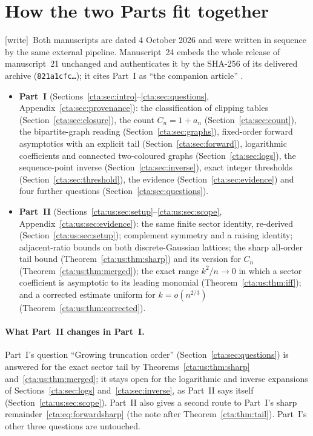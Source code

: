 \documentclass[11pt]{article}
\theoremstyle{definition}
\theoremstyle{remark}
\newcommand{\wtag}{\textup{[write]}}
\begin{document}
\setcounter{tocdepth}{1}
\tableofcontents
\newpage

\section{How the two Parts fit together}\label{cta:sec:guide}

\wtag\ Both manuscripts are dated 4 October 2026 and were written in
sequence by the same external pipeline. Manuscript~24 embeds the whole
release of manuscript~21 unchanged and authenticates it by the SHA-256 of
its delivered archive (\texttt{821a1cfc\ldots}); it cites Part~I as
``the companion article'' \cite{fixed}.

\begin{itemize}
\item \textbf{Part~I} (Sections~\ref{cta:sec:intro}--\ref{cta:sec:questions},
Appendix~\ref{cta:sec:provenance}): the classification of clipping tables
(Section~\ref{cta:sec:closure}), the count $C_n=1+a_n$
(Section~\ref{cta:sec:count}), the bipartite-graph reading
(Section~\ref{cta:sec:graphs}), fixed-order forward asymptotics with an
explicit tail (Section~\ref{cta:sec:forward}), logarithmic coefficients and
connected two-coloured graphs (Section~\ref{cta:sec:logs}), the
sequence-point inverse (Section~\ref{cta:sec:inverse}), exact integer
thresholds (Section~\ref{cta:sec:threshold}), the evidence
(Section~\ref{cta:sec:evidence}) and four further questions
(Section~\ref{cta:sec:questions}).
\item \textbf{Part~II} (Sections~\ref{cta:us:sec:setup}--\ref{cta:us:sec:scope},
Appendix~\ref{cta:us:sec:evidence}): the same finite sector identity,
re-derived (Section~\ref{cta:us:sec:setup}); complement symmetry and a
raising identity; adjacent-ratio bounds on both discrete-Gaussian lattices;
the sharp all-order tail bound (Theorem~\ref{cta:us:thm:sharp}) and its
version for $C_n$ (Theorem~\ref{cta:us:thm:merged}); the exact range
$k^2/n\to0$ in which a sector coefficient is asymptotic to its leading
monomial (Theorem~\ref{cta:us:thm:iff}); and a corrected estimate uniform
for $k=o(n^{2/3})$ (Theorem~\ref{cta:us:thm:corrected}).
\end{itemize}

\paragraph{What Part~II changes in Part~I.} Part~I's question ``Growing
truncation order'' (Section~\ref{cta:sec:questions}) is answered for the
exact sector tail by Theorems~\ref{cta:us:thm:sharp}
and~\ref{cta:us:thm:merged}; it stays open for the logarithmic and inverse
expansions of Sections~\ref{cta:sec:logs} and~\ref{cta:sec:inverse}, as
Part~II says itself (Section~\ref{cta:us:sec:scope}). Part~II also gives a
second route to Part~I's sharp remainder~\eqref{cta:eq:forwardsharp}
(the note after Theorem~\ref{cta:thm:tail}). Part~I's other three
questions are untouched.
\end{document}
